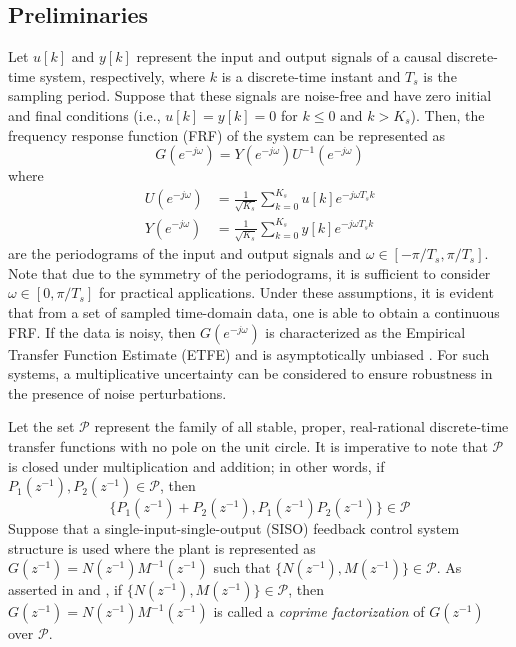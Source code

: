 \documentclass[journal]{IEEEtran}
\begin{document}
\subsection{Preliminaries}
Let $u[k]$ and $y[k]$ represent the input and output signals of a causal discrete-time system, respectively, where $k$ is a discrete-time instant and $T_s$ is the sampling period. Suppose that these signals are noise-free and have zero initial and final conditions (i.e., $u[k] = y[k] = 0$ for $k \leq 0$ and $k > K_s$). Then, the frequency response function (FRF) of the system can be represented as 
\begin{equation}
G(e^{-j\omega}) = Y(e^{-j\omega}) U^{-1}(e^{-j\omega})
\end{equation}
where
\begin{align}
U(e^{-j\omega}) &= \frac{1}{\sqrt{K_s}} \sum_{k=0}^{K_s} u[k]e^{-j \omega T_s k} \label{eq:U_period}\\
Y(e^{-j\omega}) &= \frac{1}{\sqrt{K_s}} \sum_{k=0}^{K_s} y[k]e^{-j \omega T_s k}
\end{align} 
are the periodograms of the input and output signals and $\omega \in [-\pi/T_s, \pi/T_s]$. Note that due to the symmetry of the periodograms, it is sufficient to consider $\omega \in [0, \pi/T_s]$ for practical applications. Under these assumptions, it is evident that from a set of sampled time-domain data, one is able to obtain a continuous FRF.  If the data is noisy, then $G(e^{-j\omega})$ is characterized as the Empirical Transfer Function Estimate (ETFE) and is asymptotically unbiased \cite{Lju99}. For such systems, a multiplicative uncertainty can be considered to ensure robustness in the presence of noise perturbations. 

Let the set $\mathscr{P}$ represent the family of all stable, proper, real-rational discrete-time transfer functions with no pole on the unit circle. It is imperative to note that $\mathscr{P}$ is closed under multiplication and addition; in other words, if $P_1(z^{-1}),P_2(z^{-1}) \in \mathscr{P}$, then 
\begin{equation}
\{ P_1(z^{-1})+P_2(z^{-1}),P_1(z^{-1})P_2(z^{-1})\} \in \mathscr{P}
\end{equation}
Suppose that a single-input-single-output (SISO) feedback control system structure is used where the plant is represented as $G(z^{-1}) = N(z^{-1})M^{-1}(z^{-1})$ such that $\{N(z^{-1}),M(z^{-1})\} \in \mathscr{P}$. As asserted in \cite{ZD98} and \cite{DFT92}, if $\{N(z^{-1}), M(z^{-1})\} \in \mathscr{P}$, then $G(z^{-1}) = N(z^{-1})M^{-1}(z^{-1})$ is called a \textit{coprime factorization} of $G(z^{-1})$ over $\mathscr{P}$.
\end{document}
